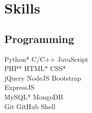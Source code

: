 \documentclass[]{deedy-resume-openfont}
\begin{document}
\begin{minipage}[t]{0.33\textwidth}
\sectionsep


\section{Skills}
\subsection{Programming}
Python* \textbullet{} C/C++ \textbullet{} JavaScript \\
PHP* \textbullet{} HTML* \textbullet{} CSS* \\ 
jQuery \textbullet{} NodeJS \textbullet{} Bootstrap  \\
ExpressJS\\
MySQL* \textbullet{} MongoDB\\
Git \textbullet{} GitHub \textbullet{} Shell
\sectionsep

%
%

\end{minipage} 
\hfill
\end{document}
